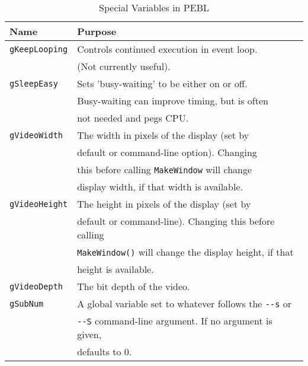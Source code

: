 \begin{table}[htbp]
\caption{Special Variables in PEBL}

\begin{tabular}{ll}
\toprule
\textbf{Name}&\textbf{Purpose}\\
\midrule
\verb+gKeepLooping+ & Controls continued execution in event loop. \\
 &           (Not currently useful).\\
\addlinespace[.2cm]
\verb+gSleepEasy+      &Sets 'busy-waiting' to be either on or off.\\
                       &Busy-waiting can improve timing, but is often\\
                       &not needed and pegs CPU.   \\
\verb+gVideoWidth+  &	The width in pixels of the display (set by\\
             &  default or command-line option). Changing \\
             &  this before calling \verb+MakeWindow+ will change \\
             &  display width, if that width is available. \\
\addlinespace[.2cm]
\verb+gVideoHeight+ & 	The height in pixels of the display (set by\\
             & 	default or command-line). Changing this before calling \\
             &  \verb+MakeWindow()+ will change the display height, if that \\
             &  height is available.\\
\addlinespace[.2cm]
\verb+gVideoDepth+    &      	The bit depth of the video.\\

\addlinespace[.2cm]
\verb+gSubNum+      &  A global variable set to whatever follows the \verb+--s+ or \\
             & \verb+--S+ command-line argument.  If no argument is given, \\
             & defaults to 0.\\
\bottomrule
\end{tabular}
\label{tab:special}
\end{table}






